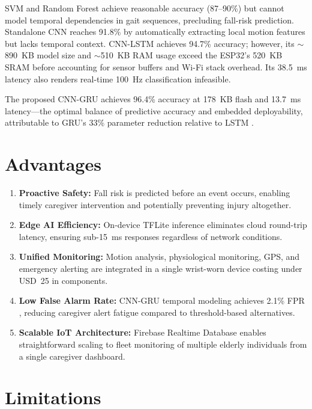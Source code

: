 \documentclass[conference]{IEEEtran}
\begin{document}
SVM \cite{b4} and Random Forest \cite{b34} achieve reasonable accuracy (87--90\%) but cannot model temporal dependencies in gait sequences, precluding fall-risk prediction. Standalone CNN \cite{b33} reaches 91.8\% by automatically extracting local motion features but lacks temporal context. CNN-LSTM \cite{b5} achieves 94.7\% accuracy; however, its $\sim$890~KB model size and $\sim$510~KB RAM usage exceed the ESP32's 520~KB SRAM before accounting for sensor buffers and Wi-Fi stack overhead. Its 38.5~ms latency also renders real-time 100~Hz classification infeasible.

The proposed CNN-GRU achieves 96.4\% accuracy at 178~KB flash and 13.7~ms latency---the optimal balance of predictive accuracy and embedded deployability, attributable to GRU's 33\% parameter reduction relative to LSTM \cite{b6}.

\section{Advantages}

\begin{enumerate}
    \item \textbf{Proactive Safety:} Fall risk is predicted before an event occurs, enabling timely caregiver intervention and potentially preventing injury altogether.
    \item \textbf{Edge AI Efficiency:} On-device TFLite inference eliminates cloud round-trip latency, ensuring sub-15~ms responses regardless of network conditions.
    \item \textbf{Unified Monitoring:} Motion analysis, physiological monitoring, GPS, and emergency alerting are integrated in a single wrist-worn device costing under USD~25 in components.
    \item \textbf{Low False Alarm Rate:} CNN-GRU temporal modeling achieves 2.1\% FPR \cite{b4}, reducing caregiver alert fatigue compared to threshold-based alternatives.
    \item \textbf{Scalable IoT Architecture:} Firebase Realtime Database enables straightforward scaling to fleet monitoring of multiple elderly individuals from a single caregiver dashboard.
\end{enumerate}

\section{Limitations}
\end{document}
